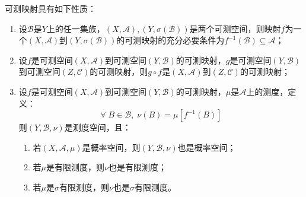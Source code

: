 \begin{property}\label{prop:MeasurableMapping}
	可测映射具有如下性质：
	\begin{enumerate}
		\item 设$\mathscr{B}$是$Y$上的任一集族，$(X,\mathscr{A}),(Y,\sigma(\mathscr{B}))$是两个可测空间，则映射$f$为一个$(X,\mathscr{A})$到$(Y,\sigma(\mathscr{B}))$的可测映射的充分必要条件为$f^{-1}(\mathscr{B})\subseteq\mathscr{A}$；
		\item 设$f$是可测空间$(X,\mathscr{A})$到可测空间$(Y,\mathscr{B})$的可测映射，$g$是可测空间$(Y,\mathscr{B})$到可测空间$(Z,\mathscr{C})$的可测映射，则$g\circ f$是$(X,\mathscr{A})$到$(Z,\mathscr{C})$的可测映射；
		\item 设$f$是可测空间$(X,\mathscr{A})$到可测空间$(Y,\mathscr{B})$的可测映射，$\mu$是$\mathscr{A}$上的测度，定义：
		\begin{equation*}
			\forall\;B\in\mathscr{B},\;\nu(B)=\mu[f^{-1}(B)]
		\end{equation*}
		则$(Y,\mathscr{B},\nu)$是测度空间，且：
		\begin{enumerate}
			\item 若$(X,\mathscr{A},\mu)$是概率空间，则$(Y,\mathscr{B},\nu)$也是概率空间；
			\item 若$\mu$是有限测度，则$\nu$也是有限测度；
			\item 若$\mu$是$\sigma$有限测度，则$\nu$也是$\sigma$有限测度。
		\end{enumerate}
	\end{enumerate}
\end{property}
